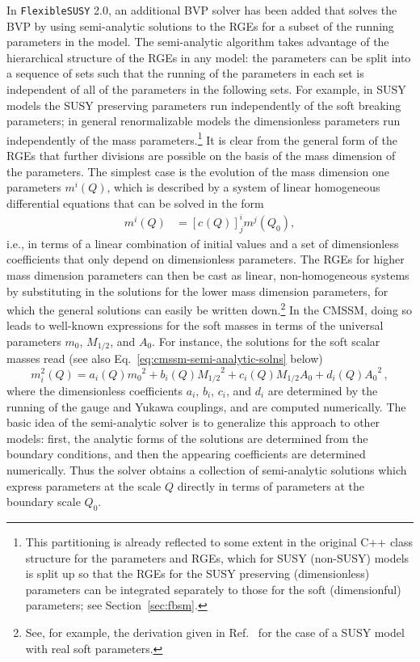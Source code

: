 \documentclass[final,3p,11pt,pdflatex]{elsarticle}
\makeatletter
\newcommand{\fs}{\texttt{FlexibleSUSY}\@\xspace}
\newcommand{\fstwo}{\fs 2.0\@\xspace}
\newcommand{\secref}[1]{Section~\ref{#1}}
\newcommand{\scoeff}[2]{[ c^{#1}_{#2}(Q) ]}
\newcommand{\azero}{\ensuremath{A_0}\xspace}
\newcommand{\mhalf}{\ensuremath{M_{1/2}}\xspace}
\newcommand{\mzero}{\ensuremath{m_0}\xspace}
\makeatother
\begin{document}
In \fstwo, an additional BVP solver has been added that solves the BVP
by using semi-analytic solutions to the RGEs for a subset of the
running parameters in the model.  The semi-analytic algorithm takes
advantage of the hierarchical structure of the RGEs in any model: the parameters
can be split into a sequence of sets such that the running of the parameters
in each set is independent of all of the parameters in the following
sets.  For example, in SUSY models the SUSY preserving parameters run
independently of the soft breaking parameters; in general renormalizable
models the dimensionless parameters run independently of the mass
parameters.\footnote{This partitioning is already reflected to some extent in
  the original C++ class structure for the parameters and
RGEs, which for SUSY (non-SUSY) models is split up so that
the RGEs for the SUSY preserving (dimensionless) parameters can be integrated
separately to those for the soft (dimensionful) parameters; see
\secref{sec:fbsm}.}
It is clear from the general form of the RGEs
\cite{Machacek:1983tz,Machacek:1983fi,Machacek:1984zw,Martin:1993zk,
  Yamada:1994id,Jack:1997eh,Luo:2002ti,Fonseca:2011vn,Goodsell:2012fm,
  Fonseca:2013bua,Sperling:2013eva,Sperling:2013xqa} that further
divisions are possible on the basis of the mass dimension of the
parameters.  The simplest case is the evolution of the mass dimension
one parameters $m^i(Q)$, which is described by a system of linear homogeneous
differential equations that can be solved in the form
\begin{align}
m^i(Q) &= \scoeff{}{}^i_j m^j(Q_0) ,
\end{align}
i.e., in terms of a linear combination of initial values and a set of
dimensionless coefficients that only depend on dimensionless parameters.
The RGEs for higher mass dimension parameters can then be cast as linear,
non-homogeneous systems by substituting in the solutions for the lower
mass dimension parameters, for which the general solutions can easily
be written down.\footnote{See, for example, the derivation given in
  Ref.~\cite{Athron:2009bs} for the case of a SUSY model with real
  soft parameters.}  In the CMSSM, doing so leads to well-known expressions
for the soft masses in terms of the universal parameters $\mzero$, $\mhalf$,
and $\azero$.  For instance, the solutions for the soft scalar masses read
(see also Eq.~\eqref{eq:cmssm-semi-analytic-solns} below)
\begin{equation*}
  m_i^2(Q) = a_i(Q) \mzero^2 + b_i(Q) \mhalf^2
  + c_i(Q) \mhalf \azero + d_i(Q) \azero^2 \, ,
\end{equation*}
where the dimensionless coefficients $a_i$, $b_i$, $c_i$, and $d_i$ are
determined by the running of the gauge and Yukawa couplings, and are computed
numerically.  The basic idea of the semi-analytic solver is to generalize this
approach to other models: first, the analytic forms of the solutions are
determined from the boundary conditions, and then the appearing coefficients
are determined numerically.  Thus the solver obtains a collection of
semi-analytic solutions which express parameters at the scale $Q$ directly in
terms of parameters at the boundary scale $Q_0$.
\end{document}
